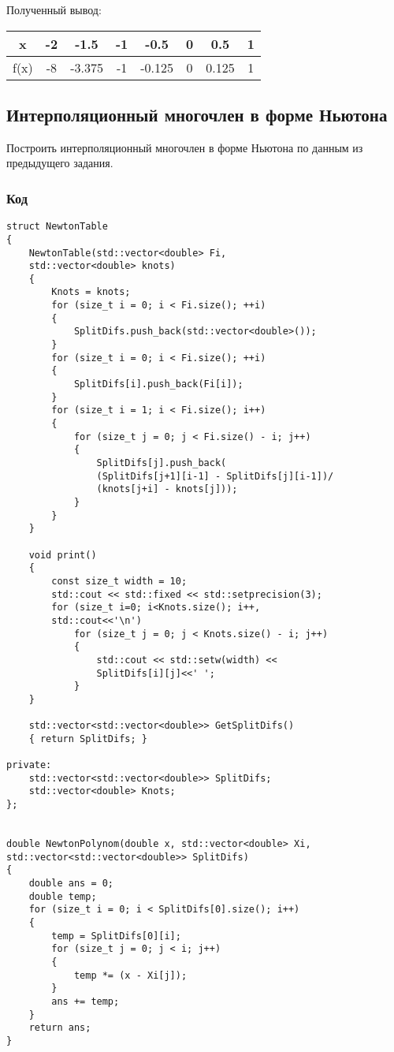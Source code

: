 \documentclass[bachelor, och, pract]{SCWorks}
\begin{document}
Полученный вывод:

\begin{table}[h]
    \centering
    \begin{tabular}{|c|c|c|c|c|c|c|c|}
         \hline x & -2 & -1.5 & -1 & -0.5 & 0 & 0.5 & 1\\\hline
          f(x) &  -8 & -3.375 & -1 & -0.125 & 0 & 0.125 & 1 \\\hline
    \end{tabular}
\end{table}


\subsection{Интерполяционный многочлен в форме Ньютона}

Построить интерполяционный многочлен в форме Ньютона по данным из предыдущего задания.

\subsubsection{Код}

\begin{lstlisting}
struct NewtonTable
{
    NewtonTable(std::vector<double> Fi, 
    std::vector<double> knots)
    {
        Knots = knots;
        for (size_t i = 0; i < Fi.size(); ++i)
        {
            SplitDifs.push_back(std::vector<double>());
        }
        for (size_t i = 0; i < Fi.size(); ++i)
        {
            SplitDifs[i].push_back(Fi[i]);
        }
        for (size_t i = 1; i < Fi.size(); i++)
        {
            for (size_t j = 0; j < Fi.size() - i; j++)
            {
                SplitDifs[j].push_back(
                (SplitDifs[j+1][i-1] - SplitDifs[j][i-1])/
                (knots[j+i] - knots[j]));
            }
        }
    }

    void print()
    {
        const size_t width = 10;
        std::cout << std::fixed << std::setprecision(3);
        for (size_t i=0; i<Knots.size(); i++, 
        std::cout<<'\n')
            for (size_t j = 0; j < Knots.size() - i; j++)
            {
                std::cout << std::setw(width) << 
                SplitDifs[i][j]<<' ';
            }
    }

    std::vector<std::vector<double>> GetSplitDifs() 
    { return SplitDifs; }

private:
    std::vector<std::vector<double>> SplitDifs;
    std::vector<double> Knots;
};


double NewtonPolynom(double x, std::vector<double> Xi,
std::vector<std::vector<double>> SplitDifs)
{
    double ans = 0;
    double temp;
    for (size_t i = 0; i < SplitDifs[0].size(); i++)
    {
        temp = SplitDifs[0][i];
        for (size_t j = 0; j < i; j++)
        {
            temp *= (x - Xi[j]);
        }
        ans += temp;
    }
    return ans;
}
\end{lstlisting}
\end{document}
